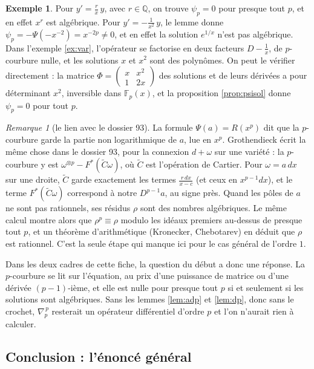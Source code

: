 \documentclass[11pt,a4paper]{article}
\theoremstyle{plain}
\theoremstyle{definition}
\newtheorem{exemple}[theoreme]{Exemple}
\theoremstyle{remark}
\newtheorem{remarque}[theoreme]{Remarque}
\newcommand{\Q}{\mathbb{Q}}
\newcommand{\F}{\mathbb{F}}
\newcommand{\Dx}{D}
\begin{document}
\begin{exemple}
Pour $y' = \frac{r}{x}\,y$, avec $r \in \Q$, on trouve $\psi_p = 0$ pour presque tout $p$, et en effet $x^r$ est algébrique. Pour $y' = -\frac{1}{x^2}\,y$, le lemme donne $\psi_p = -\Psi(-x^{-2}) = x^{-2p} \neq 0$, et en effet la solution $e^{1/x}$ n'est pas algébrique. Dans l'exemple \ref{ex:var}, l'opérateur se factorise en deux facteurs $\Dx - \frac1x$, de $p$-courbure nulle, et les solutions $x$ et $x^2$ sont des polynômes. On peut le vérifier directement : la matrice $\Phi = \begin{pmatrix} x & x^2 \\ 1 & 2x \end{pmatrix}$ des solutions et de leurs dérivées a pour déterminant $x^2$, inversible dans $\F_p(x)$, et la proposition \ref{prop:psisol} donne $\psi_p = 0$ pour tout $p$.
\end{exemple}

\begin{remarque}[le lien avec le dossier 93]
La formule $\Psi(a) = R(x^p)$ dit que la $p$-courbure garde la partie non logarithmique de $a$, lue en $x^p$. Grothendieck écrit la même chose dans le dossier 93, pour la connexion $d + \omega$ sur une variété : la $p$-courbure y est $\omega^{\otimes p} - F^*(\widetilde C\omega)$, où $\widetilde C$ est l'opération de Cartier. Pour $\omega = a\,dx$ sur une droite, $\widetilde C$ garde exactement les termes $\frac{r\,dx}{x-c}$ (et ceux en $x^{p-1}dx$), et le terme $F^*(\widetilde C\omega)$ correspond à notre $\Dx^{p-1}a$, au signe près. Quand les pôles de $a$ ne sont pas rationnels, ses résidus $\rho$ sont des nombres algébriques. Le même calcul montre alors que $\rho^p \equiv \rho$ modulo les idéaux premiers au-dessus de presque tout $p$, et un théorème d'arithmétique (Kronecker, Chebotarev) en déduit que $\rho$ est rationnel. C'est la seule étape qui manque ici pour le cas général de l'ordre $1$.
\end{remarque}

Dans les deux cadres de cette fiche, la question du début a donc une réponse. La $p$-courbure se lit sur l'équation, au prix d'une puissance de matrice ou d'une dérivée $(p-1)$-ième, et elle est nulle pour presque tout $p$ si et seulement si les solutions sont algébriques. Sans les lemmes \ref{lem:adp} et \ref{lem:dp}, donc sans le crochet, $\nabla_p^{\,p}$ resterait un opérateur différentiel d'ordre $p$ et l'on n'aurait rien à calculer.

\subsection{Conclusion : l'énoncé général}
\end{document}
